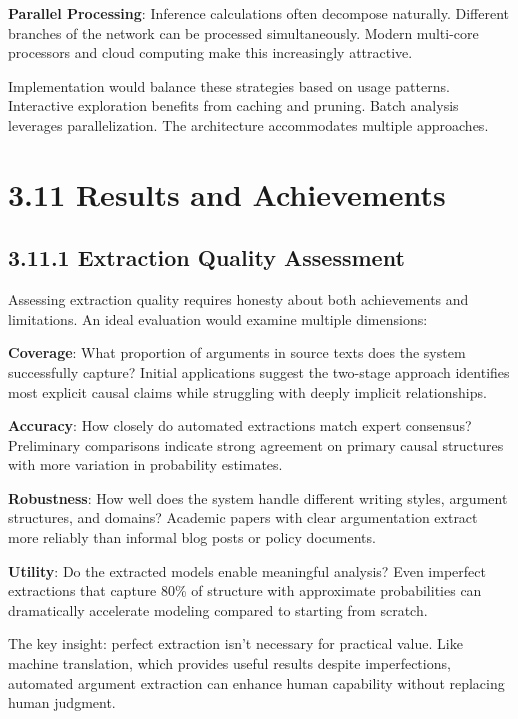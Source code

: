 \documentclass[
  11pt,
  letterpaper,
  openany]{book}
\begin{document}
\textbf{Parallel Processing}: Inference calculations often decompose
naturally. Different branches of the network can be processed
simultaneously. Modern multi-core processors and cloud computing make
this increasingly attractive.

Implementation would balance these strategies based on usage patterns.
Interactive exploration benefits from caching and pruning. Batch
analysis leverages parallelization. The architecture accommodates
multiple approaches.

\section{3.11 Results and Achievements}\label{sec-results-achievements}

\subsection{3.11.1 Extraction Quality
Assessment}\label{sec-extraction-quality}

Assessing extraction quality requires honesty about both achievements
and limitations. An ideal evaluation would examine multiple dimensions:

\textbf{Coverage}: What proportion of arguments in source texts does the
system successfully capture? Initial applications suggest the two-stage
approach identifies most explicit causal claims while struggling with
deeply implicit relationships.

\textbf{Accuracy}: How closely do automated extractions match expert
consensus? Preliminary comparisons indicate strong agreement on primary
causal structures with more variation in probability estimates.

\textbf{Robustness}: How well does the system handle different writing
styles, argument structures, and domains? Academic papers with clear
argumentation extract more reliably than informal blog posts or policy
documents.

\textbf{Utility}: Do the extracted models enable meaningful analysis?
Even imperfect extractions that capture 80\% of structure with
approximate probabilities can dramatically accelerate modeling compared
to starting from scratch.

The key insight: perfect extraction isn't necessary for practical value.
Like machine translation, which provides useful results despite
imperfections, automated argument extraction can enhance human
capability without replacing human judgment.
\end{document}
